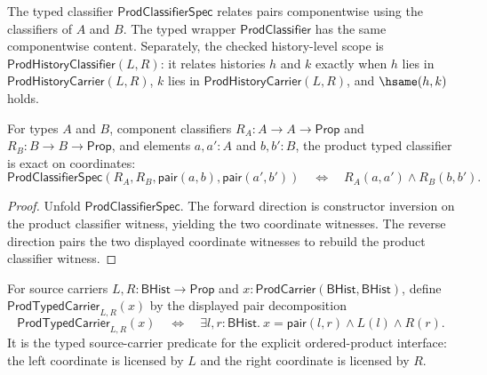 \begin{definition}
\label{def:prod-classifier-specification}
The typed classifier $\mathsf{ProdClassifierSpec}$ relates pairs componentwise using the classifiers of $A$ and $B$. The typed wrapper $\mathsf{ProdClassifier}$ has the same componentwise content. Separately, the checked history-level scope is $\mathsf{ProdHistoryClassifier}(L,R)$: it relates histories $h$ and $k$ exactly when $h$ lies in $\mathsf{ProdHistoryCarrier}(L,R)$, $k$ lies in $\mathsf{ProdHistoryCarrier}(L,R)$, and $\hsame(h,k)$ holds.
\end{definition}

\begin{theorem}
\label{thm:prod-classifier-coordinate-exactness}
For types $A$ and $B$, component classifiers $R_A:A\to A\to\mathsf{Prop}$
and $R_B:B\to B\to\mathsf{Prop}$, and elements $a,a':A$ and $b,b':B$,
the product typed classifier is exact on coordinates:
$$
\mathsf{ProdClassifierSpec}(R_A,R_B,\mathsf{pair}(a,b),\mathsf{pair}(a',b'))
\quad\Longleftrightarrow\quad
R_A(a,a')\land R_B(b,b').
$$
\end{theorem}
\begin{proof}
Unfold $\mathsf{ProdClassifierSpec}$. The forward direction is constructor
inversion on the product classifier witness, yielding the two coordinate
witnesses. The reverse direction pairs the two displayed coordinate witnesses
to rebuild the product classifier witness.
\end{proof}

\begin{definition}
\label{def:product-typed-source-carrier}
For source carriers $L,R:\mathsf{BHist}\to\mathsf{Prop}$ and
$x:\mathsf{ProdCarrier}(\mathsf{BHist},\mathsf{BHist})$, define
$\mathsf{ProdTypedCarrier}_{L,R}(x)$ by the displayed pair decomposition
$$
\mathsf{ProdTypedCarrier}_{L,R}(x)
\quad\Longleftrightarrow\quad
\exists l,r:\mathsf{BHist}.\ x=\mathsf{pair}(l,r)\land L(l)\land R(r).
$$
It is the typed source-carrier predicate for the explicit ordered-product
interface: the left coordinate is licensed by $L$ and the right coordinate is
licensed by $R$.
\end{definition}


